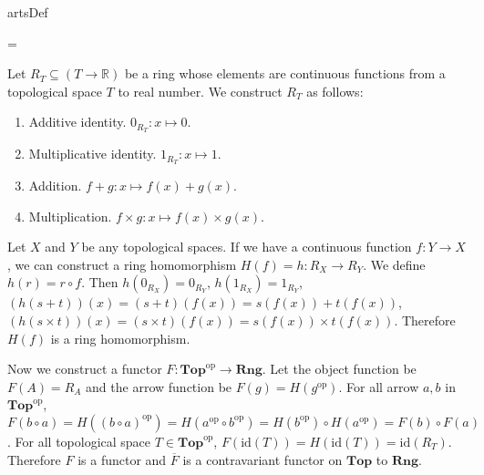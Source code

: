 \documentclass{article}
\newcounter{artCounter}
\newcounter{maxArts}
\newcommand{\showArt}{
\csname artsDef\roman{artCounter}\endcsname
\addtocounter{artCounter}{1}
\ifnum \value{artCounter}=\value{maxArts}
\setcounter{artCounter}{0}
\fi
}
\begin{document}
\subsubsection{}



\showArt

Let $R_T \subseteq (T \rightarrow \mathbb{R})$ be a ring whose elements are continuous functions from a topological space $T$ to real number. We construct $R_T$ as follows:

\begin{enumerate}
    \item Additive identity. $0_{R_T} : x \mapsto 0$.
    \item Multiplicative identity. $1_{R_T} : x \mapsto 1$.
    \item Addition. $f + g : x \mapsto f(x) + g(x)$.
    \item Multiplication. $f \times g : x \mapsto f(x) \times g(x)$.
\end{enumerate}

Let $X$ and $Y$ be any topological spaces. If we have a continuous function $f : Y \rightarrow X$, we can construct a ring homomorphism $H(f) = h : R_X \rightarrow R_Y$. We define $h(r) = r \circ f$. Then $h(0_{R_X}) = 0_{R_Y}$, $h(1_{R_X}) = 1_{R_Y}$, $(h(s + t))(x) = (s + t)(f(x)) = s(f(x)) + t(f(x))$, $(h(s \times t))(x) = (s \times t)(f(x)) = s(f(x)) \times t(f(x))$. Therefore $H(f)$ is a ring homomorphism.

Now we construct a functor $F : \mathbf{Top}^{\mathrm{op}} \rightarrow \mathbf{Rng}$. Let the object function be $F(A) = R_A$ and the arrow function be $F(g) = H(g^{\mathrm{op}})$. For all arrow $a, b$ in $\mathbf{Top}^{\mathrm{op}}$, $F(b \circ a) = H((b \circ a)^{\mathrm{op}}) = H(a^{\mathrm{op}} \circ b^{\mathrm{op}}) = H(b^{\mathrm{op}}) \circ H(a^{\mathrm{op}}) = F(b) \circ F(a)$. For all topological space $T \in \mathbf{Top}^{\mathrm{op}}$, $F(\mathrm{id}(T)) = H(\mathrm{id}(T)) = \mathrm{id}(R_T)$. Therefore $F$ is a functor and $\overline{F}$ is a contravariant functor on $\mathbf{Top}$ to $\mathbf{Rng}$.

\subsection{}

\subsubsection{}
\end{document}
